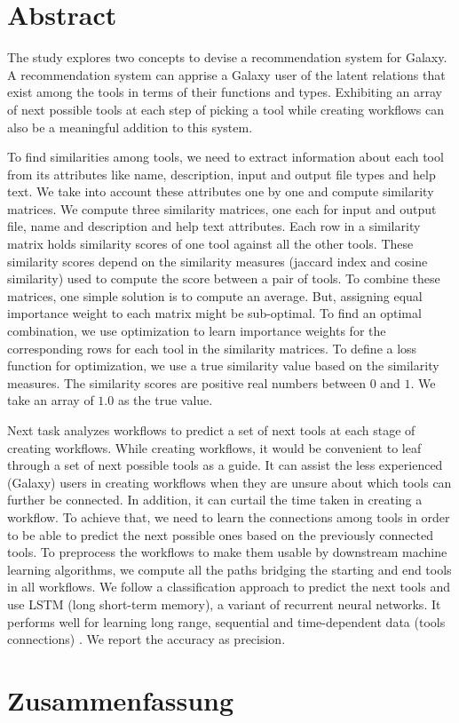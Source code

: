 \chapter*{Abstract}
The study explores two concepts to devise a recommendation system for Galaxy. A recommendation system can apprise a Galaxy user of the latent relations that exist among the tools in terms of their functions and types. Exhibiting an array of next possible tools at each step of picking a tool while creating workflows can also be a meaningful addition to this system. 

To find similarities among tools, we need to extract information about each tool from its attributes like name, description, input and output file types and help text. We take into account these attributes one by one and compute similarity matrices. We compute three similarity matrices, one each for input and output file, name and description and help text attributes. Each row in a similarity matrix holds similarity scores of one tool against all the other tools. These similarity scores depend on the similarity measures (jaccard index and cosine similarity) used to compute the score between a pair of tools. To combine these matrices, one simple solution is to compute an average. But, assigning equal importance weight to each matrix might be sub-optimal. To find an optimal combination, we use optimization to learn importance weights for the corresponding rows for each tool in the similarity matrices. To define a loss function for optimization, we use a true similarity value based on the similarity measures. The similarity scores are positive real numbers between $0$ and $1$. We take an array of $1.0$ as the true value.

Next task analyzes workflows to predict a set of next tools at each stage of creating workflows. While creating workflows, it would be convenient to leaf through a set of next possible tools as a guide. It can assist the less experienced (Galaxy) users in creating workflows when they are unsure about which tools can further be connected. In addition, it can curtail the time taken in creating a workflow. To achieve that, we need to learn the connections among tools in order to be able to predict the next possible ones based on the previously connected tools. To preprocess the workflows to make them usable by downstream machine learning algorithms, we compute all the paths bridging the starting and end tools in all workflows. We follow a classification approach to predict the next tools and use LSTM (long short-term memory), a variant of recurrent neural networks. It performs well for learning long range, sequential and time-dependent data (tools connections) \cite{LiptonKEW15, SakSB14}. We report the accuracy as precision.


\chapter*{Zusammenfassung}

